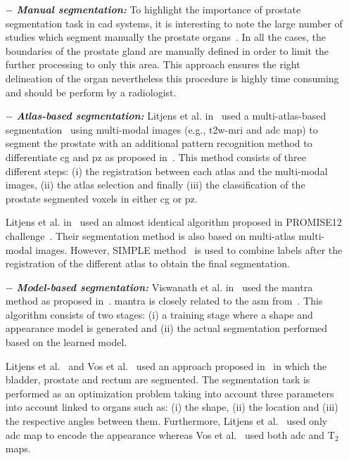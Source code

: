 \begin{enumerate}[leftmargin=*]

\item[$-$] \textbf{\textit{Manual segmentation:}} To highlight the importance of prostate segmentation task in \ac{cad} systems, it is interesting to note the large number of studies which segment manually the prostate organs~\cite{Artan2009,Artan2010,Matulewicz2013,Niaf2011,Niaf2012,Ozer2009,Ozer2010,Puech2009,Vos2008,Vos2008a}. In all the cases, the boundaries of the prostate gland are manually defined in order to limit the further processing to only this area. This approach ensures the right delineation of the organ nevertheless this procedure is highly time consuming and should be perform by a radiologist.

\item[$-$] \textbf{\textit{Atlas-based segmentation:}} Litjens et al. in~\cite{Litjens2012} used a multi-atlas-based segmentation~\cite{Klein2008} using multi-modal images (e.g., \ac{t2w}-\ac{mri} and \ac{adc} map) to segment the prostate with an additional pattern recognition method to differentiate \ac{cg} and \ac{pz} as proposed in~\cite{Litjens2012a}. This method consists of three different steps: (i) the registration between each atlas and the multi-modal images, (ii) the atlas selection and finally (iii) the classification of the prostate segmented voxels in either \ac{cg} or \ac{pz}. 

  Litjens et al. in~\cite{Litjens2014} used an almost identical algorithm proposed in PROMISE12 challenge~\cite{Litjens2014a}. Their segmentation method is also based on multi-atlas multi-modal images. However, SIMPLE method~\cite{Langerak2010} is used to combine labels after the registration of the different atlas to obtain the final segmentation.

\item[$-$] \textbf{\textit{Model-based segmentation:}} Viswanath et al. in~\cite{Viswanath2008a,Viswanath2009} used the \ac{mantra} method as proposed in~\cite{Toth2008}. \ac{mantra} is closely related to the \ac{asm} from~\cite{Cootes1995}. This algorithm consists of two stages: (i) a training stage where a shape and appearance model is generated and (ii) the actual segmentation performed based on the learned model. 

  Litjens et al.~\cite{Litjens2011} and Vos et al.~\cite{Vos2012} used an approach proposed in~\cite{Huisman2010} in which the bladder, prostate and rectum are segmented. The segmentation task is performed as an optimization problem taking into account three parameters into account linked to organs such as: (i) the shape, (ii) the location and (iii) the respective angles between them. Furthermore, Litjens et al.~\cite{Litjens2011} used only \ac{adc} map to encode the appearance whereas Vos et al.~\cite{Vos2012} used both \ac{adc} and T$_2$ maps.

\end{enumerate}

